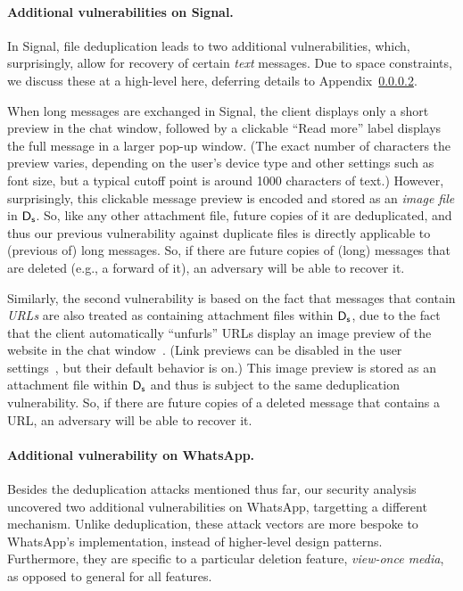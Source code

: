 \paragraph{Additional vulnerabilities on Signal.} In Signal, file deduplication leads to two additional vulnerabilities, which, surprisingly, allow for recovery of certain \emph{text} messages. Due to space constraints, we discuss these at a high-level here, deferring details to Appendix~\ref{}. 

When long messages are exchanged in Signal, the client displays only a short preview in the chat window, followed by a clickable ``Read more''  label displays the full message in a larger pop-up window. (The exact number of characters the preview varies, depending on the user's device type and other settings such as font size, but a typical cutoff point is around 1000 characters of text.) However, surprisingly, this clickable message preview is encoded and stored as an \emph{image file} in $\textsf{D}_{\textsf{s}}$. So, like any other attachment file, future copies of it are deduplicated, and thus our previous vulnerability against duplicate files is directly applicable to (previous of) long messages. So, if there are future copies of (long) messages that are deleted (e.g., a forward of it), an adversary will be able to recover it.

Similarly, the second vulnerability is based on the fact that messages that contain \emph{URLs} are also treated as containing attachment files within $\textsf{D}_{\textsf{s}}$, due to the fact that the client automatically ``unfurls'' URLs display an image preview of the website in the chat window~\cite{signal-link-previews}. (Link previews can be disabled in the user settings~\cite{signal-link-previews}, but their default behavior is on.) This image preview is stored as an attachment file within $\textsf{D}_{\textsf{s}}$ and thus is subject to the same deduplication vulnerability. So, if there are future copies of a deleted message that contains a URL, an adversary will be able to recover it.

\paragraph{Additional vulnerability on WhatsApp.} Besides the deduplication attacks mentioned thus far, our security analysis uncovered two additional vulnerabilities on WhatsApp, targetting a different mechanism. Unlike deduplication, these attack vectors are more bespoke to WhatsApp's implementation, instead of higher-level design patterns. Furthermore, they are specific to a particular deletion feature, \emph{view-once media}, as opposed to general for all features.


